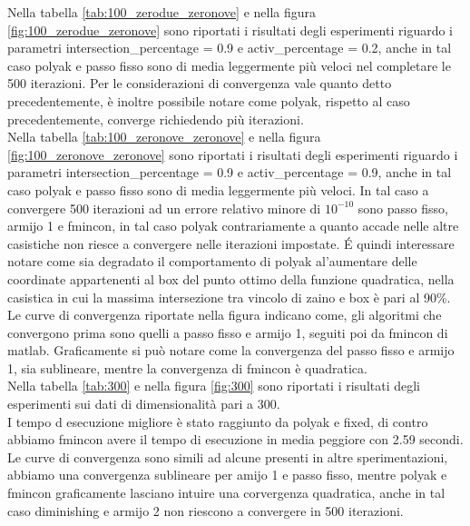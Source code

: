 \documentclass[12pt]{extarticle}
\begin{document}
Nella tabella \ref{tab:100_zerodue_zeronove} e nella figura \ref{fig:100_zerodue_zeronove} sono riportati i risultati degli esperimenti riguardo i parametri intersection\_percentage = 0.9 e activ\_percentage = 0.2, anche in tal caso polyak e passo fisso sono di media leggermente più veloci nel completare le 500 iterazioni. Per le considerazioni di convergenza vale quanto detto precedentemente, è inoltre possibile notare come polyak, rispetto al caso precedentemente, converge richiedendo più iterazioni.\\
Nella tabella \ref{tab:100_zeronove_zeronove}  e nella figura \ref{fig:100_zeronove_zeronove}  sono riportati i risultati degli esperimenti riguardo i parametri intersection\_percentage = 0.9 e activ\_percentage = 0.9, anche in tal caso polyak e passo fisso sono di media leggermente più veloci. In tal caso a convergere 500 iterazioni ad un errore relativo minore di $10^{-10}$ sono passo fisso, armijo 1 e fmincon, in tal caso polyak contrariamente a quanto accade nelle altre casistiche non riesce a convergere nelle iterazioni impostate. \'E quindi interessare notare come sia degradato il comportamento di polyak al'aumentare delle coordinate appartenenti al box del punto ottimo della funzione quadratica, nella casistica in cui la massima intersezione tra vincolo di zaino e box è pari al 90\%. Le curve di convergenza riportate nella figura indicano come, gli algoritmi che convergono prima sono quelli a passo fisso e armijo 1, seguiti poi da fmincon di matlab. Graficamente si può notare come la convergenza del passo fisso e armijo 1, sia sublineare, mentre la convergenza di fmincon è quadratica.\\
Nella tabella \ref{tab:300} e nella figura \ref{fig:300} sono riportati i risultati degli esperimenti sui dati di dimensionalità pari a 300.\\
I tempo d esecuzione migliore è stato raggiunto da polyak e fixed, di contro abbiamo fmincon avere il tempo di esecuzione in media peggiore con 2.59 secondi. Le curve di convergenza sono simili ad alcune presenti in altre sperimentazioni, abbiamo una convergenza sublineare per amijo 1 e passo fisso, mentre polyak e fmincon graficamente lasciano intuire una corvergenza quadratica, anche in tal caso diminishing e armijo 2 non riescono a convergere in 500 iterazioni.

\end{document}
